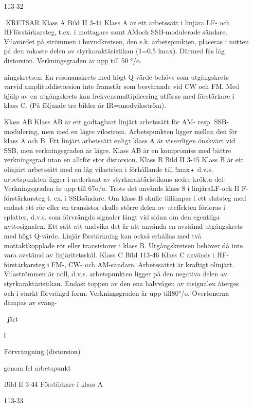 113-32

KRETSAR
Klass A
Bild II 3-44
Klass A är ett arbetssätt i linjära LF- och HFförstärkarsteg, t.ex. i mottagare samt AMoch SSB-modulerade sändare. Vilavärdet
på strömmen i huvudkretsen, den s.k. arbetspunkten, placeras i mitten på den rakaste delen av styrkaraktäristikan (1=0.5 lmax).
Därmed fås låg distorsion. Verkningsgraden
är upp till 50 °/o.

ningskretsen. En resonanskrets med högt
Q-värde behövs som utgångskrets varvid
amplituddistorsion inte framstår som besvärande vid CW och FM. Med hjälp av en
utgångskrets kan frekvensmultiplicering utföras med förstärkare i klass C.
(På följande tre bilder är IR=anodviloström).

Klass AB
Klass AB är ett godtagbart linjärt arbetssätt
för AM- resp. SSB-modulering, men med en
lägre viloström. Arbetspunkten ligger mellan
den för klass A och B. Ett linjärt arbetssätt
enligt klass A är visserligen önskvärt vid
SSB, men verkningsgraden är lägre. Klass
AB är en kompromiss med bättre verkningsgrad utan en alltför stor distorsion.
Klass B
Bild II 3-45
Klass B är ett olinjärt arbetssätt med en låg
vilaström i förhållande till !max• d.v.s. arbetspunkten ligger i nederkant av styrkaraktäristikans nedre krökta del. Verkningsgraden
är upp till 67o/o. Trots det används klass 8 i
linjäraLF-och H F-förstärkarsteg t. ex. i SSBsändare.
Om klass B skulle tillämpas i ett slutsteg
med endast ett rör eller en transistor skulle
större delen av uteffekten förloras i splatter,
d.v.s. som förvrängda signaler långt vid sidan om den egentliga nyttosignalen. Ett sätt
att undvika det är att använda en avstämd
utgångskrets med högt Q-värde. Linjär förstärkning kan också erhållas med två mottaktkopplade rör eller transistorer i klass B.
Utgångskretsen behöver då inte vara avstämd av linjäritetsskäl.
Klass C
Bild 113-46
Klass C används i HF-förstärkarsteg i FM-,
CW- och AM-sändare. Arbetssättet är kraftigt olinjärt. Vilaströmmen är noll, d.v.s. arbetspunkten ligger på den negativa delen av
styrkaraktäristikan. Endast toppen av den
ena halvvågen av insignalen återges och i
starkt förvrängd form. Verkningsgraden är
upp till80°/o. Övertonerna dämpas av sväng-

~järt

l

Förvrängning
(distorsion)

genom fel arbetspunkt

Bild If 3-44 Förstärkare i klass A

113-33

